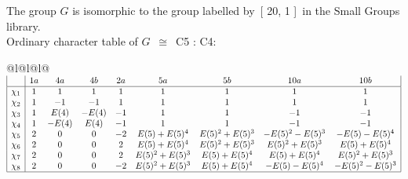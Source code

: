 \documentclass[varwidth=\maxdimen,border=10]{standalone}
\begin{document}
The group $G$ is isomorphic to the group labelled by\ [ 20, 1 ]\ in the Small Groups library.\\
Ordinary character table of $G$\ $\cong$\ C5 : C4:\\
\begin{center}
\begin{tabular}{@{}l@{}l@{}l@{}}
\hline
\(\begin{array}{|l|cccccccc|}
  & 1a & 4a & 4b & 2a & 5a & 5b & 10a & 10b\\ \hline
\chi_{1} & 1 & 1 & 1 & 1 & 1 & 1 & 1 & 1\\
\chi_{2} & 1 & -1 & -1 & 1 & 1 & 1 & 1 & 1\\
\chi_{3} & 1 & E(4) & -E(4) & -1 & 1 & 1 & -1 & -1\\
\chi_{4} & 1 & -E(4) & E(4) & -1 & 1 & 1 & -1 & -1\\
\chi_{5} & 2 & 0 & 0 & -2 & E(5)+E(5)^{4} & E(5)^{2}+E(5)^{3} & -E(5)^{2}-E(5)^{3} & -E(5)-E(5)^{4}\\
\chi_{6} & 2 & 0 & 0 & 2 & E(5)+E(5)^{4} & E(5)^{2}+E(5)^{3} & E(5)^{2}+E(5)^{3} & E(5)+E(5)^{4}\\
\chi_{7} & 2 & 0 & 0 & 2 & E(5)^{2}+E(5)^{3} & E(5)+E(5)^{4} & E(5)+E(5)^{4} & E(5)^{2}+E(5)^{3}\\
\chi_{8} & 2 & 0 & 0 & -2 & E(5)^{2}+E(5)^{3} & E(5)+E(5)^{4} & -E(5)-E(5)^{4} & -E(5)^{2}-E(5)^{3}\\
\hline
\end{array}\)\\
\end{tabular}
\end{center}
\end{document}
